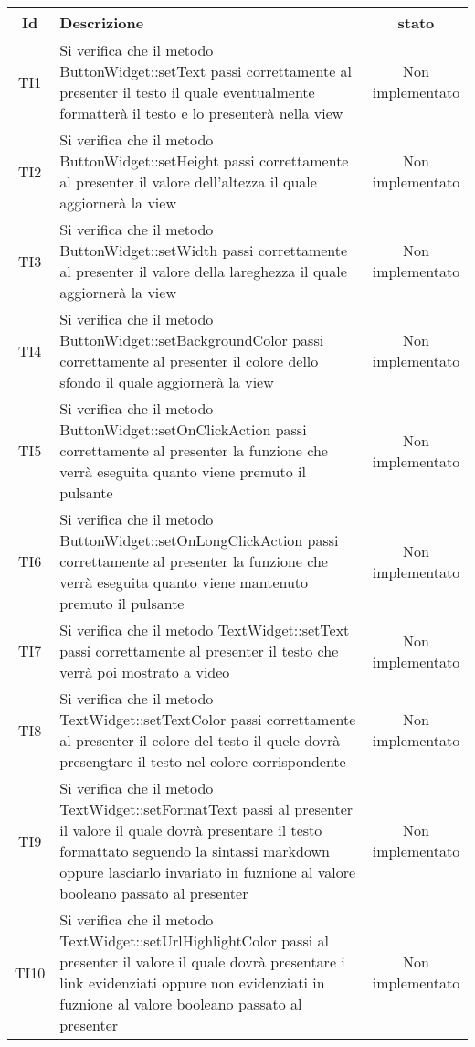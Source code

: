 \begin{center}
	\begin{longtable}{|c|>{\centering}m{10cm}|c|}\hline
		Id & Descrizione & stato \\ \hline
		TI1 & Si verifica che il metodo ButtonWidget::setText passi correttamente al presenter il testo il  quale eventualmente formatterà il testo e lo presenterà nella view & Non implementato \\ \hline
		TI2 & Si verifica che il metodo ButtonWidget::setHeight passi correttamente al presenter il valore dell'altezza il quale aggiornerà la view & Non implementato \\ \hline
		TI3 & Si verifica che il metodo ButtonWidget::setWidth passi correttamente al presenter il valore della lareghezza il quale aggiornerà la view & Non implementato \\ \hline
		TI4 & Si verifica che il metodo ButtonWidget::setBackgroundColor passi correttamente al presenter il colore dello sfondo il quale aggiornerà la view & Non implementato \\ \hline
		TI5 & Si verifica che il metodo ButtonWidget::setOnClickAction passi correttamente al presenter la funzione che verrà eseguita quanto viene premuto il pulsante & Non implementato \\ \hline
		TI6 & Si verifica che il metodo ButtonWidget::setOnLongClickAction passi correttamente al presenter la funzione che verrà eseguita quanto viene mantenuto premuto il pulsante & Non implementato \\ \hline
		TI7 & Si verifica che il metodo TextWidget::setText passi correttamente al presenter il testo che verrà poi mostrato a video & Non implementato \\ \hline
		TI8 & Si verifica che il metodo TextWidget::setTextColor passi correttamente al presenter il colore del testo il quele dovrà presengtare il testo nel colore corrispondente & Non implementato \\ \hline
		TI9 & Si verifica che il metodo TextWidget::setFormatText passi al presenter il valore il quale dovrà presentare il testo formattato seguendo la sintassi markdown oppure lasciarlo invariato in fuznione al valore booleano passato al presenter & Non implementato \\ \hline
		TI10 & Si verifica che il metodo TextWidget::setUrlHighlightColor passi al presenter il valore il quale dovrà presentare i link evidenziati oppure non evidenziati in fuznione al valore booleano passato al presenter & Non implementato \\ \hline

\end{longtable}
\end{center}

